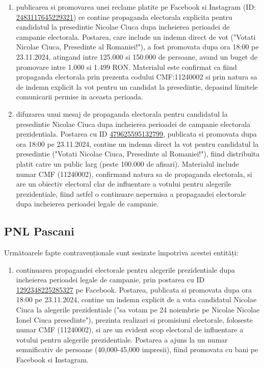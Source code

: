 \documentclass[a4paper,12pt]{article}
\begin{document}
\begin{enumerate}[leftmargin=*, label=\arabic*.)]
    \item publicarea si promovarea unei reclame platite pe Facebook si Instagram (ID: \href{https://www.facebook.com/ads/library/?id=2483117645229321}{2483117645229321}) ce contine propaganda electorala explicita pentru candidatul la presedintie Nicolae Ciuca dupa incheierea perioadei de campanie electorala. Postarea, care include un indemn direct de vot ("Votati Nicolae Ciuca, Presedinte al Romaniei!"), a fost promovata dupa ora 18:00 pe 23.11.2024, atingand intre 125.000 si 150.000 de persoane, avand un buget de promovare intre 1.000 si 1.499 RON. Materialul este confirmat ca fiind propaganda electorala prin prezenta codului CMF:11240002 si prin natura sa de indemn explicit la vot pentru un candidat la presedintie, depasind limitele comunicarii permise in aceasta perioada.
    \item difuzarea unui mesaj de propaganda electorala pentru candidatul la presedintie Nicolae Ciuca dupa incheierea perioadei de campanie electorala prezidentiala. Postarea cu ID \href{https://www.facebook.com/ads/library/?id=479625595132799}{479625595132799}, publicata si promovata dupa ora 18:00 pe 23.11.2024, contine un indemn direct la vot pentru candidatul la presedintie ("Votati Nicolae Ciuca, Presedinte al Romaniei!"), fiind distribuita platit catre un public larg (peste 100.000 de afisari). Materialul include numar CMF (11240002), confirmand natura sa de propaganda electorala, si are un obiectiv electoral clar de influentare a votului pentru alegerile prezidentiale, fiind astfel o continuare nepermisa a propagandei electorale dupa incheierea perioadei legale de campanie.
\end{enumerate}

\vspace{0.5cm}

\subsection{PNL Pascani}
Următoarele fapte contravenționale sunt sesizate împotriva acestei entități:

\begin{enumerate}[leftmargin=*, label=\arabic*.)]
    \item continuarea propagandei electorale pentru alegerile prezidentiale dupa incheierea perioadei legale de campanie, prin postarea cu ID \href{https://www.facebook.com/ads/library/?id=1292348225285327}{1292348225285327} pe Facebook. Postarea, publicata si promovata dupa ora 18:00 pe 23.11.2024, contine un indemn explicit de a vota candidatul Nicolae Ciuca la alegerile prezidentiale ("sa votam pe 24 noiembrie pe Nicolae Nicolae Ionel Ciuca presedinte"), prezinta realizari si promisiuni electorale, foloseste numar CMF (11240002), si are un evident scop electoral de influentare a votului pentru alegerile prezidentiale. Postarea a ajuns la un numar semnificativ de persoane (40,000-45,000 impresii), fiind promovata cu bani pe Facebook si Instagram.
\end{enumerate}
\end{document}
